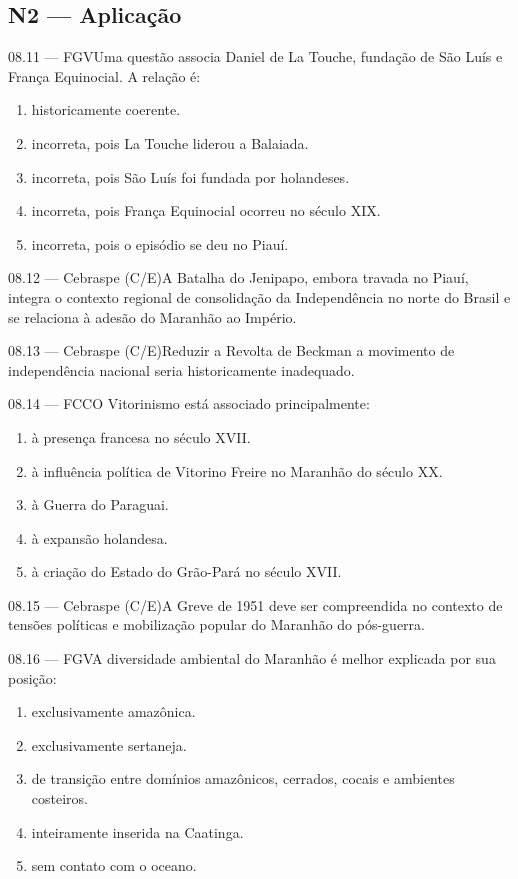 \subsection*{N2 — Aplicação}
\begin{questao}{ 08.11 — FGV}Uma questão associa Daniel de La Touche, fundação de São Luís e França Equinocial. A relação é:\begin{enumerate}[label=\Alph*)]\item historicamente coerente.\item incorreta, pois La Touche liderou a Balaiada.\item incorreta, pois São Luís foi fundada por holandeses.\item incorreta, pois França Equinocial ocorreu no século XIX.\item incorreta, pois o episódio se deu no Piauí.\end{enumerate}\end{questao}
\begin{questao}{ 08.12 — Cebraspe (C/E)}A Batalha do Jenipapo, embora travada no Piauí, integra o contexto regional de consolidação da Independência no norte do Brasil e se relaciona à adesão do Maranhão ao Império.\end{questao}
\begin{questao}{ 08.13 — Cebraspe (C/E)}Reduzir a Revolta de Beckman a movimento de independência nacional seria historicamente inadequado.\end{questao}
\begin{questao}{ 08.14 — FCC}O Vitorinismo está associado principalmente:\begin{enumerate}[label=\Alph*)]\item à presença francesa no século XVII.\item à influência política de Vitorino Freire no Maranhão do século XX.\item à Guerra do Paraguai.\item à expansão holandesa.\item à criação do Estado do Grão-Pará no século XVII.\end{enumerate}\end{questao}
\begin{questao}{ 08.15 — Cebraspe (C/E)}A Greve de 1951 deve ser compreendida no contexto de tensões políticas e mobilização popular do Maranhão do pós-guerra.\end{questao}
\begin{questao}{ 08.16 — FGV}A diversidade ambiental do Maranhão é melhor explicada por sua posição:\begin{enumerate}[label=\Alph*)]\item exclusivamente amazônica.\item exclusivamente sertaneja.\item de transição entre domínios amazônicos, cerrados, cocais e ambientes costeiros.\item inteiramente inserida na Caatinga.\item sem contato com o oceano.\end{enumerate}\end{questao}
